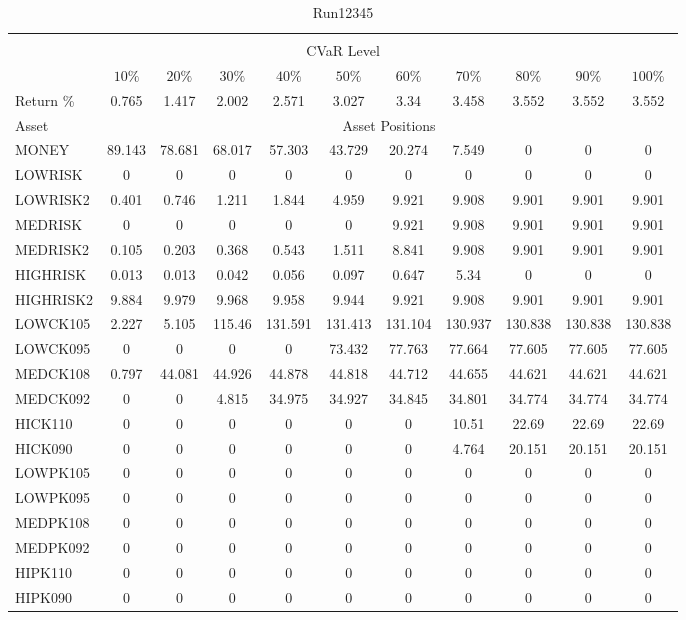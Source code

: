 \begin{table}[h!t]
\caption{Run12345}
\centering
\begin{tabular}[t]{ l c c c c c c c c c c }
\hline\hline \\
\multicolumn{11}{c}{CVaR Level} \\
 & $10\%$ & $20\%$ & $30\%$ & $40\%$ & $50\%$ & $60\%$ & $70\%$ & $80\%$ & $90\%$ & $100\%$ \\[0.5ex]
Return \% &0.765 &1.417 &2.002 &2.571 &3.027 &3.34 &3.458 &3.552 &3.552 &3.552\\[0.5ex]
Asset & \multicolumn{10}{c}{Asset Positions} \\[1ex]
MONEY & 89.143 & 78.681 & 68.017 & 57.303 & 43.729 & 20.274 & 7.549 & 0 & 0 & 0\\
LOWRISK & 0 & 0 & 0 & 0 & 0 & 0 & 0 & 0 & 0 & 0\\
LOWRISK2 & 0.401 & 0.746 & 1.211 & 1.844 & 4.959 & 9.921 & 9.908 & 9.901 & 9.901 & 9.901\\
MEDRISK & 0 & 0 & 0 & 0 & 0 & 9.921 & 9.908 & 9.901 & 9.901 & 9.901\\
MEDRISK2 & 0.105 & 0.203 & 0.368 & 0.543 & 1.511 & 8.841 & 9.908 & 9.901 & 9.901 & 9.901\\
HIGHRISK & 0.013 & 0.013 & 0.042 & 0.056 & 0.097 & 0.647 & 5.34 & 0 & 0 & 0\\
HIGHRISK2 & 9.884 & 9.979 & 9.968 & 9.958 & 9.944 & 9.921 & 9.908 & 9.901 & 9.901 & 9.901\\
LOWCK105 & 2.227 & 5.105 & 115.46 & 131.591 & 131.413 & 131.104 & 130.937 & 130.838 & 130.838 & 130.838\\
LOWCK095 & 0 & 0 & 0 & 0 & 73.432 & 77.763 & 77.664 & 77.605 & 77.605 & 77.605\\
MEDCK108 & 0.797 & 44.081 & 44.926 & 44.878 & 44.818 & 44.712 & 44.655 & 44.621 & 44.621 & 44.621\\
MEDCK092 & 0 & 0 & 4.815 & 34.975 & 34.927 & 34.845 & 34.801 & 34.774 & 34.774 & 34.774\\
HICK110 & 0 & 0 & 0 & 0 & 0 & 0 & 10.51 & 22.69 & 22.69 & 22.69\\
HICK090 & 0 & 0 & 0 & 0 & 0 & 0 & 4.764 & 20.151 & 20.151 & 20.151\\
LOWPK105 & 0 & 0 & 0 & 0 & 0 & 0 & 0 & 0 & 0 & 0\\
LOWPK095 & 0 & 0 & 0 & 0 & 0 & 0 & 0 & 0 & 0 & 0\\
MEDPK108 & 0 & 0 & 0 & 0 & 0 & 0 & 0 & 0 & 0 & 0\\
MEDPK092 & 0 & 0 & 0 & 0 & 0 & 0 & 0 & 0 & 0 & 0\\
HIPK110 & 0 & 0 & 0 & 0 & 0 & 0 & 0 & 0 & 0 & 0\\
HIPK090 & 0 & 0 & 0 & 0 & 0 & 0 & 0 & 0 & 0 & 0\\
[1ex] \hline
\end{tabular}
\end{table} 